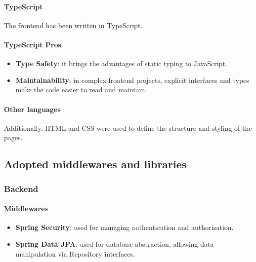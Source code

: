 \paragraph{TypeScript}
The frontend has been written in TypeScript. 

\paragraph{TypeScript Pros}
\begin{itemize}
    \item \textbf{Type Safety}: it brings the advantages of static typing to JavaScript.
    \item \textbf{Maintainability}: in complex frontend projects, explicit interfaces and types make the code easier to read and maintain.
\end{itemize}

\paragraph{Other languages}
Additionally, HTML  and CSS  were used to define the structure and styling of the pages.

\subsection{Adopted middlewares and libraries}

\subsubsection*{Backend}
\paragraph{Middlewares}
\begin{itemize}
    \item \textbf{Spring Security}: used for managing authentication and authorization.
    \item \textbf{Spring Data JPA}: used for database abstraction, allowing data manipulation via Repository interfaces.
\end{itemize}

